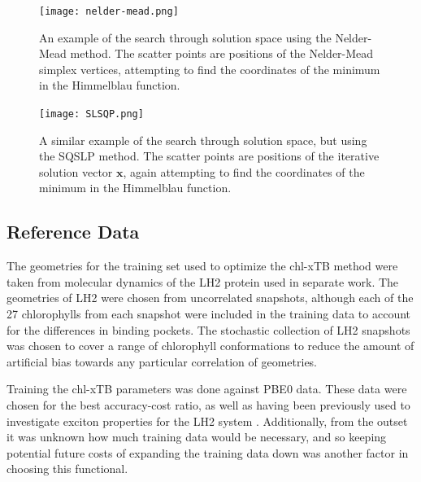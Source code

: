 \begin{figure}
    \texttt{[image: nelder-mead.png]}
    \caption{An example of the search through solution space using the Nelder-Mead
    method. The scatter points are positions of the Nelder-Mead simplex vertices,
    attempting to find the coordinates of the minimum in the Himmelblau function.}
    \label{fig:nelder_mead}
\end{figure}

\begin{figure}
    \texttt{[image: SLSQP.png]}
    \caption{A similar example of the search through solution space, but using the
    SQSLP method. The scatter points are positions of the iterative solution vector
    $\mathbf{x}$, again attempting to find the coordinates of the minimum in the 
    Himmelblau function.}
    \label{fig:slsqp}
\end{figure}

\subsection{Reference Data}
\label{subsec:ref_data}
The geometries for the training set used to optimize the chl-xTB method were taken
from molecular dynamics of the LH2 protein used in separate work\cite{Stross2016}. 
The geometries of LH2 were chosen from uncorrelated snapshots, although each of
the 27 chlorophylls from each snapshot were included in the training data to account
for the differences in binding pockets. The stochastic collection of LH2 snapshots
was chosen to cover a range of chlorophyll conformations to reduce the amount of
artificial bias towards any particular correlation of geometries.

Training the chl-xTB parameters was done against PBE0 data. These data were chosen
for the best accuracy-cost ratio, as well as having been previously used to investigate
exciton properties for the LH2 system \cite{Stross2016}. Additionally, from the
outset it was unknown how much training data would be necessary, and so keeping 
potential future costs of expanding the training data down was another factor in 
choosing this functional.

